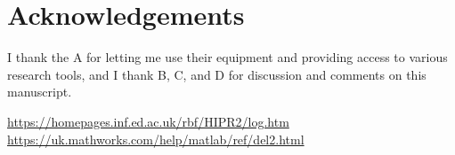 \documentclass{Resources/UoBLab1}
\begin{document}
\section*{Acknowledgements}
I thank the A for letting me use their equipment and providing access to various research tools, and I thank B, C, and D for discussion and comments on this manuscript.

\begin{thebibliography}{}

    \url{https://homepages.inf.ed.ac.uk/rbf/HIPR2/log.htm}
    \url{https://uk.mathworks.com/help/matlab/ref/del2.html}
\end{thebibliography}
\end{document}
